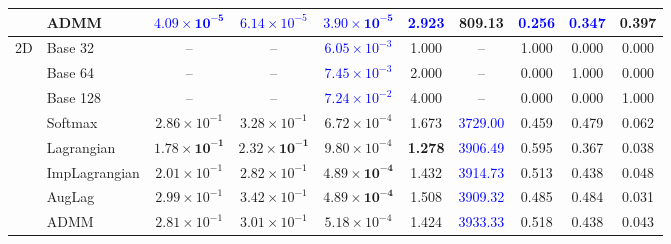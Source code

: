 \documentclass[preprint,12pt,authoryear]{elsarticle}
\begin{document}
\begin{table}[tbp]
{\begin{tabular}{@{}ll ccc ccc cc@{}}
                    & ADMM          & \textcolor{blue}{$\mathbf{4.09 \times 10^{-5}}$} & \textcolor{blue}{$6.14 \times 10^{-5}$} & \textcolor{blue}{$\mathbf{3.90 \times 10^{-5}}$} & \textcolor{blue}{2.923} & 809.13 & \textcolor{blue}{0.256} & \textcolor{blue}{0.347} & 0.397 \\
\midrule
\multirow{7}{*}{2D} & Base 32       & -- & -- & \textcolor{blue}{$6.05 \times 10^{-3}$} & 1.000 & -- & 1.000 & 0.000 & 0.000 \\
                    & Base 64       & -- & -- & \textcolor{blue}{$7.45 \times 10^{-3}$} & 2.000 & -- & 0.000 & 1.000 & 0.000 \\
                    & Base 128      & -- & -- & \textcolor{blue}{$7.24 \times 10^{-2}$} & 4.000 & -- & 0.000 & 0.000 & 1.000 \\
                    \cmidrule(lr){2-10}
                    & Softmax       & $2.86 \times 10^{-1}$ & $3.28 \times 10^{-1}$ & $6.72 \times 10^{-4}$ & 1.673 & \textcolor{blue}{$\mathbf{3729.00}$} & 0.459 & 0.479 & 0.062 \\
                    & Lagrangian    & $\mathbf{1.78 \times 10^{-1}}$ & $\mathbf{2.32 \times 10^{-1}}$ & $9.80 \times 10^{-4}$ & \textbf{1.278} & \textcolor{blue}{3906.49} & 0.595 & 0.367 & 0.038 \\
                    & ImpLagrangian & $2.01 \times 10^{-1}$ & $2.82 \times 10^{-1}$ & $\mathbf{4.89 \times 10^{-4}}$ & 1.432 & \textcolor{blue}{3914.73} & 0.513 & 0.438 & 0.048 \\
                    & AugLag        & $2.99 \times 10^{-1}$ & $3.42 \times 10^{-1}$ & $\mathbf{4.89 \times 10^{-4}}$ & 1.508 & \textcolor{blue}{3909.32} & 0.485 & 0.484 & 0.031 \\
                    & ADMM          & $2.81 \times 10^{-1}$ & $3.01 \times 10^{-1}$ & $5.18 \times 10^{-4}$ & 1.424 & \textcolor{blue}{3933.33} & 0.518 & 0.438 & 0.043 \\
\bottomrule
\end{tabular}
}
\end{table}
\end{document}

